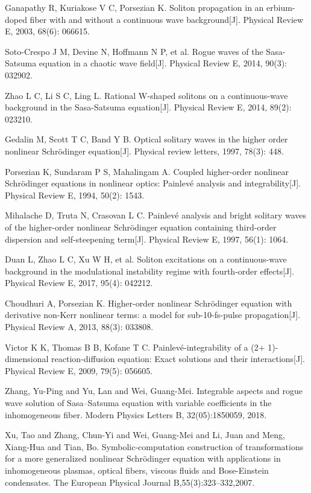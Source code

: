\begin{thebibliography}{0}
Ganapathy R, Kuriakose V C, Porsezian K. Soliton propagation in an erbium-doped fiber with and without a continuous wave background[J]. Physical Review E, 2003, 68(6): 066615.

Soto-Crespo J M, Devine N, Hoffmann N P, et al. Rogue waves of the Sasa-Satsuma equation in a chaotic wave field[J]. Physical Review E, 2014, 90(3): 032902.

Zhao L C, Li S C, Ling L. Rational W-shaped solitons on a continuous-wave background in the Sasa-Satsuma equation[J]. Physical Review E, 2014, 89(2): 023210.

Gedalin M, Scott T C, Band Y B. Optical solitary waves in the higher order nonlinear Schrödinger equation[J]. Physical review letters, 1997, 78(3): 448.

Porsezian K, Sundaram P S, Mahalingam A. Coupled higher-order nonlinear Schrödinger equations in nonlinear optics: Painlevé analysis and integrability[J]. Physical Review E, 1994, 50(2): 1543.

Mihalache D, Truta N, Crasovan L C. Painlevé analysis and bright solitary waves of the higher-order nonlinear Schrödinger equation containing third-order dispersion and self-steepening term[J]. Physical Review E, 1997, 56(1): 1064.

Duan L, Zhao L C, Xu W H, et al. Soliton excitations on a continuous-wave background in the modulational instability regime with fourth-order effects[J]. Physical Review E, 2017, 95(4): 042212.

Choudhuri A, Porsezian K. Higher-order nonlinear Schrödinger equation with derivative non-Kerr nonlinear terms: a model for sub-10-fs-pulse propagation[J]. Physical Review A, 2013, 88(3): 033808.

Victor K K, Thomas B B, Kofane T C. Painlevé-integrability of a (2+ 1)-dimensional reaction-diffusion equation: Exact solutions and their interactions[J]. Physical Review E, 2009, 79(5): 056605.





Zhang, Yu-Ping and Yu, Lan and Wei, Guang-Mei. Integrable aspects and rogue wave solution of Sasa--Satsuma equation with variable coefficients in the inhomogeneous fiber. Modern Physics Letters B, 32(05):1850059, 2018.

Xu, Tao and Zhang, Chun-Yi and Wei, Guang-Mei and Li, Juan and Meng, Xiang-Hua and Tian, Bo. Symbolic-computation construction of transformations for a more generalized nonlinear Schr{\"o}dinger equation with applications in inhomogeneous plasmas, optical fibers, viscous fluids and Bose-Einstein condensates. The European Physical Journal B,55(3):323--332,2007.


\end{thebibliography}
